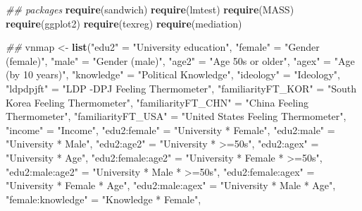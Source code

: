 \documentclass[
]{article}
\newenvironment{Shaded}{\begin{snugshade}}{\end{snugshade}}
\newcommand{\CommentTok}[1]{\textcolor[rgb]{0.56,0.35,0.01}{\textit{#1}}}
\newcommand{\KeywordTok}[1]{\textcolor[rgb]{0.13,0.29,0.53}{\textbf{#1}}}
\newcommand{\NormalTok}[1]{#1}
\newcommand{\StringTok}[1]{\textcolor[rgb]{0.31,0.60,0.02}{#1}}
\begin{document}
\begin{Shaded}
\begin{Highlighting}[]
\CommentTok{## packages}
\KeywordTok{require}\NormalTok{(sandwich)}
\KeywordTok{require}\NormalTok{(lmtest)}
\KeywordTok{require}\NormalTok{(MASS)}
\KeywordTok{require}\NormalTok{(ggplot2)}
\KeywordTok{require}\NormalTok{(texreg)}
\KeywordTok{require}\NormalTok{(mediation)}

\CommentTok{##}
\NormalTok{vnmap <-}\StringTok{ }\KeywordTok{list}\NormalTok{(}\StringTok{"edu2"}\NormalTok{ =}\StringTok{ "University education"}\NormalTok{,}
              \StringTok{"female"}\NormalTok{ =}\StringTok{ "Gender (female)"}\NormalTok{,}
              \StringTok{"male"}\NormalTok{ =}\StringTok{ "Gender (male)"}\NormalTok{,}
              \StringTok{"age2"}\NormalTok{ =}\StringTok{ "Age 50s or older"}\NormalTok{,}
              \StringTok{"agex"}\NormalTok{ =}\StringTok{ "Age (by 10 years)"}\NormalTok{,}
              \StringTok{"knowledge"}\NormalTok{ =}\StringTok{ "Political Knowledge"}\NormalTok{,}
              \StringTok{"ideology"}\NormalTok{ =}\StringTok{ "Ideology"}\NormalTok{,}
              \StringTok{"ldpdpjft"}\NormalTok{ =}\StringTok{ "LDP -DPJ Feeling Thermometer"}\NormalTok{,}
              \StringTok{"familiarityFT_KOR"}\NormalTok{ =}\StringTok{ "South Korea Feeling Thermometer"}\NormalTok{,}
              \StringTok{"familiarityFT_CHN"}\NormalTok{ =}\StringTok{ "China Feeling Thermometer"}\NormalTok{,}
              \StringTok{"familiarityFT_USA"}\NormalTok{ =}\StringTok{ "United States Feeling Thermometer"}\NormalTok{,}
              \StringTok{"income"}\NormalTok{ =}\StringTok{ "Income"}\NormalTok{,}
              \StringTok{"edu2:female"}\NormalTok{ =}\StringTok{ "University * Female"}\NormalTok{,}
              \StringTok{"edu2:male"}\NormalTok{ =}\StringTok{ "University * Male"}\NormalTok{,}
              \StringTok{"edu2:age2"}\NormalTok{ =}\StringTok{ "University * >=50s"}\NormalTok{,}
              \StringTok{"edu2:agex"}\NormalTok{ =}\StringTok{ "University * Age"}\NormalTok{,}
              \StringTok{"edu2:female:age2"}\NormalTok{ =}\StringTok{ "University * Female * >=50s"}\NormalTok{,}
              \StringTok{"edu2:male:age2"}\NormalTok{ =}\StringTok{ "University * Male * >=50s"}\NormalTok{,}
              \StringTok{"edu2:female:agex"}\NormalTok{ =}\StringTok{ "University * Female * Age"}\NormalTok{,}
              \StringTok{"edu2:male:agex"}\NormalTok{ =}\StringTok{ "University * Male * Age"}\NormalTok{,}
              \StringTok{"female:knowledge"}\NormalTok{ =}\StringTok{ "Knowledge * Female"}\NormalTok{,}

\end{Highlighting}
\end{Shaded}
\end{document}
